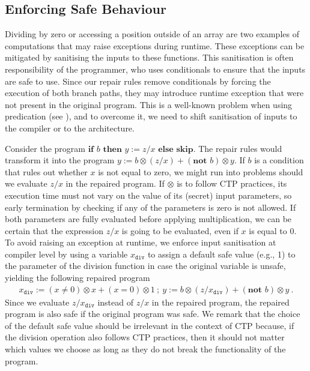 \subsection{Enforcing Safe Behaviour}
Dividing by zero or accessing a position outside of an array are two examples of computations that may raise exceptions during runtime. These exceptions can be mitigated by sanitising the inputs to these functions. This sanitisation is often responsibility of the programmer, who uses conditionals to ensure that the inputs are safe to use. Since our repair rules remove conditionals by forcing the execution of both branch paths, they may introduce runtime exception that were not present in the original program. This is a well-known problem when using predication (see \cite{Rane}), and to overcome it, we need to shift sanitisation of inputs to the compiler or to the architecture. 

Consider the program $\textbf{if }b \textbf{ then } y:=z/x \textbf{ else skip}$. The repair rules would transform it into the program $y:=b\otimes (z/x)+(\textbf{not }b)\otimes y$. If $b$ is a condition that rules out whether $x$ is not equal to zero, we might run into problems should we evaluate $z/x$ in the repaired program. If $\otimes$ is to follow CTP practices, its execution time must not vary on the value of its (secret) input parameters, so early termination by checking if any of the parameters is zero is not allowed. If both parameters are fully evaluated before applying multiplication, we can be certain that the expression $z/x$ is going to be evaluated, even if $x$ is equal to 0. %
To avoid raising an exception at runtime, we enforce input sanitisation at compiler level by using a variable $x_\texttt{div}$ to assign a default safe value (e.g., 1) to the parameter of the division function in case the original variable is unsafe, yielding the following repaired program
\begin{align}
x_\texttt{div}:= (x\neq 0)\otimes x+(x=0)\otimes 1\ ;\ y:=b\otimes (z/x_\texttt{div})+(\textbf{not }b)\otimes y\ .
\end{align}
Since we evaluate $z/x_\texttt{div}$ instead of $z/x$ in the repaired program, the repaired program is also safe if the original program was safe. We remark that the choice of the default safe value should be irrelevant in the context of CTP because, if the division operation also follows CTP practices, then it should not matter which values we choose as long as they do not break the functionality of the program. 

